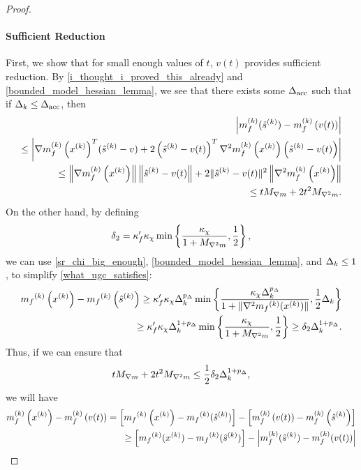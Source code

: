 \begin{proof}
\paragraph*{Sufficient Reduction}
First, we show that for small enough values of $t$, $v(t)$ provides sufficient reduction.
By \cref{i_thought_i_proved_this_already} and \cref{bounded_model_hessian_lemma}, we see that there exists some ${\Delta_{\textrm{acc}}}$ such that if
$\Delta_k \le {\Delta_{\textrm{acc}}}$, then
\begin{align*}
\left|m_f^{(k)}({{\hat s}^{(k)}} ) - m_f^{(k)}\left(v(t)\right)\right| \\
\le \left|{\nabla m_f^{(k)}\left(x^{(k)}\right)}^T({{\hat s}^{(k)}}  - v) 
+ 2 \left({{\hat s}^{(k)}}  - v(t)\right) ^T \nabla^2m_f^{(k)}\left(x^{(k)}\right)\left({{\hat s}^{(k)}}  - v(t)\right) \right| \\
\le \left\|{\nabla m_f^{(k)}\left(x^{(k)}\right)}\right \|  \left\|{{\hat s}^{(k)}} - v(t)\right\| + 2  \|{{\hat s}^{(k)}}  - v(t)\|^2 \left\|\nabla^2m_f^{(k)}\left(x^{(k)}\right)\right\| \\
\le t {M_{\nabla m}} + 2t^2{M_{\nabla^2 m}}. 
\end{align*}
On the other hand, by defining
\begin{align}
\delta_2 = \kappa_f' \kappa_{\chi} \min\left\{ \frac{\kappa_{\chi}}{1 + {M_{\nabla^2 m}}}, \frac 1 2 \right\}, \label{define_delta2}
\end{align}
we can use \cref{sr_chi_big_enough}, \cref{bounded_model_hessian_lemma}, and $\Delta_k \le 1$, to simplify \cref{what_ugc_satisfies}:
\begin{align*}
{{m}_f}^{(k)}\left(x^{(k)}\right) - {{m}_f}^{(k)}\left({{\hat s}^{(k)}} \right)
\ge \kappa_f' \kappa_{\chi} \Delta_k^{p_{\Delta}} \min\left\{ \frac{\kappa_{\chi} \Delta_k^{p_{\Delta}}}{1+\|\nabla^2 {{m}_f}^{(k)}(x^{(k)})\|}, \frac 1 2 \Delta_k \right\} \\
\ge \kappa_f' \kappa_{\chi} \Delta_k^{1 + p_{\Delta}} \min\left\{ \frac{\kappa_{\chi}}{1 + {M_{\nabla^2 m}}}, \frac 1 2  \right\}
\ge \delta_2 \Delta_k^{1 + p_{\Delta}}.
\end{align*}
Thus, if we can ensure that
\begin{align}
t {M_{\nabla m}} + 2t^2{M_{\nabla^2 m}} \le \frac 1 2 \delta_2 \Delta_k^{1 + p_{\Delta}}, \label{ensure_this}
\end{align}
we will have
\begin{align*}
m_f^{(k)}\left(\xk\right) - m_f^{(k)}\left(v(t)\right) = \left[\mfk\left(\xk\right) - \mfk(\slin )\right] - \left[m_f^{(k)}\left(v(t)\right) - m_f^{(k)}\left(\slin \right)\right] \nonumber \\
 \ge \left[\mfk(\xk) - \mfk(\slin )\right] - \left|m_f^{(k)}(\slin ) - m_f^{(k)}(v(t)) \right| \nonumber \\

\end{align*}
\end{proof}
